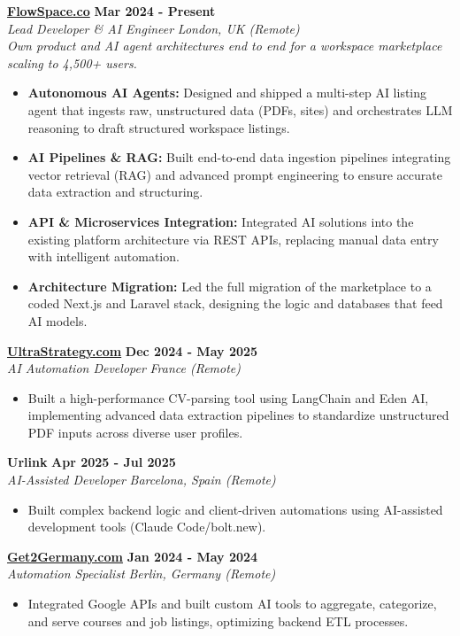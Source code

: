 \documentclass[a4paper,10pt]{article}
\newcommand{\role}[4]{%
 \textbf{#1} \hfill \textbf{#2}\\[1pt]%
 \textit{#3} \hfill \textit{#4}\\[2pt]%
}
\begin{document}
\role{\href{https://flowspace.co}{FlowSpace.co}}{Mar 2024 - Present}{Lead Developer \& AI Engineer}{London, UK (Remote)}
\textit{Own product and AI agent architectures end to end for a workspace marketplace scaling to 4,500+ users.}
\begin{itemize}
 \item \textbf{Autonomous AI Agents:} Designed and shipped a multi-step AI listing agent that ingests raw, unstructured data (PDFs, sites) and orchestrates LLM reasoning to draft structured workspace listings.
 \item \textbf{AI Pipelines \& RAG:} Built end-to-end data ingestion pipelines integrating vector retrieval (RAG) and advanced prompt engineering to ensure accurate data extraction and structuring.
 \item \textbf{API \& Microservices Integration:} Integrated AI solutions into the existing platform architecture via REST APIs, replacing manual data entry with intelligent automation.
 \item \textbf{Architecture Migration:} Led the full migration of the marketplace to a coded Next.js and Laravel stack, designing the logic and databases that feed AI models.
\end{itemize}

\role{\href{https://ultrastrategy.com}{UltraStrategy.com}}{Dec 2024 - May 2025}{AI Automation Developer}{France (Remote)}
\begin{itemize}
 \item Built a high-performance CV-parsing tool using LangChain and Eden AI, implementing advanced data extraction pipelines to standardize unstructured PDF inputs across diverse user profiles.
\end{itemize}

\role{Urlink}{Apr 2025 - Jul 2025}{AI-Assisted Developer}{Barcelona, Spain (Remote)}
\begin{itemize}
 \item Built complex backend logic and client-driven automations using AI-assisted development tools (Claude Code/bolt.new).
\end{itemize}

\role{\href{https://get2germany.com}{Get2Germany.com}}{Jan 2024 - May 2024}{Automation Specialist}{Berlin, Germany (Remote)}
\begin{itemize}
 \item Integrated Google APIs and built custom AI tools to aggregate, categorize, and serve courses and job listings, optimizing backend ETL processes.
\end{itemize}
\end{document}
